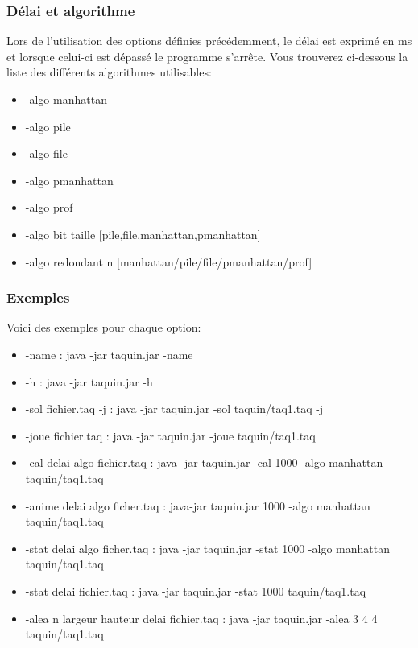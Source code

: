 \documentclass{beamer}
\begin{document}
   
  \begin{frame}
	\frametitle{Délai et algorithme}
	Lors de l'utilisation des options définies précédemment, le délai est exprimé en ms et lorsque celui-ci est dépassé le programme s'arrête. Vous trouverez ci-dessous la liste des différents algorithmes utilisables:
	\begin{itemize}
	\item -algo manhattan
	\item -algo pile
	\item -algo file
	\item -algo pmanhattan
	\item -algo prof 
	\item -algo bit taille [pile,file,manhattan,pmanhattan]
	\item -algo redondant n [manhattan/pile/file/pmanhattan/prof]
	\end{itemize}
  \end{frame}
  \begin{frame}
   \frametitle{Exemples}
	Voici des exemples pour chaque option:
\begin{itemize}
	\item -name : java -jar taquin.jar -name
	\item -h : java -jar taquin.jar -h
	\item -sol fichier.taq -j : java -jar taquin.jar -sol taquin/taq1.taq -j
	\item -joue fichier.taq : java -jar taquin.jar -joue taquin/taq1.taq
	\item -cal delai algo fichier.taq : java -jar taquin.jar -cal 1000 -algo manhattan taquin/taq1.taq 
	\end{itemize}
  \end{frame}
  
  \begin{frame}
   \begin{itemize}
    	\item -anime delai algo ficher.taq : java-jar taquin.jar 1000 -algo manhattan taquin/taq1.taq
	\item -stat delai algo ficher.taq : java -jar taquin.jar -stat 1000 -algo manhattan taquin/taq1.taq 
	\item -stat delai fichier.taq : java -jar taquin.jar -stat 1000 taquin/taq1.taq
	\item -alea n largeur hauteur delai fichier.taq : java -jar taquin.jar -alea 3 4 4 taquin/taq1.taq
   \end{itemize}

  \end{frame}
\end{document}
